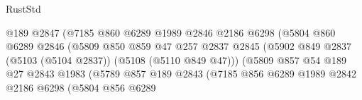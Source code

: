\begin{lexlean}{RustStd}
\begin{coremodule}
                                            @189
                                            @2847
                                            (@7185
                                              @860
                                              @6289
                                              @1989
                                              @2846
                                              @2186
                                              @6298
                                              (@5804
                                                @860
                                                @6289
                                                @2846
                                                (@5809
                                                  @850
                                                  @859
                                                  @47
                                                  @257
                                                  @2837
                                                  @2845
                                                  (@5902
                                                    @849
                                                    @2837
                                                    (@5103 (@5104 @2837))
                                                    (@5108 (@5110 @849 @47)))
                                                  (@5809
                                                    @857
                                                    @54
                                                    @189
                                                    @27
                                                    @2843
                                                    @1983
                                                    (@5789
                                                      @857
                                                      @189
                                                      @2843
                                                      (@7185
                                                        @856
                                                        @6289
                                                        @1989
                                                        @2842
                                                        @2186
                                                        @6298
                                                        (@5804
                                                          @856
                                                          @6289

\end{coremodule}
\end{lexlean}
